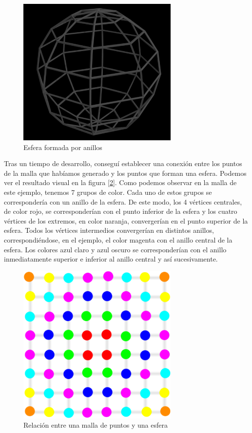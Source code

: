 \begin{figure}[h]
	\centering
	\includegraphics[width=8cm]{archivos/sphere}
	\caption{Esfera formada por anillos}
	\label{fig:sphere}
\end{figure}

Tras un tiempo de desarrollo, conseguí establecer una conexión entre los puntos de la malla que habíamos generado y los puntos que forman una esfera. Podemos ver el resultado visual en la figura [\ref{fig:planeToSphere}]. Como podemos observar en la malla de este ejemplo, tenemos 7 grupos de color. Cada uno de estos grupos se correspondería con un anillo de la esfera. De este modo, los 4 vértices centrales, de color rojo, se corresponderían con el punto inferior de la esfera y los cuatro vértices de los extremos, en color naranja, convergerían en el punto superior de la esfera. Todos los vértices intermedios convergerían en distintos anillos, correspondiéndose, en el ejemplo, el color magenta con el anillo central de la esfera. Los colores azul claro y azul oscuro se corresponderían con el anillo inmediatamente superior e inferior al anillo central y así sucesivamente.\\

\begin{figure}[h]
	\centering
	\includegraphics[width=8cm]{archivos/planeToSphere}
	\caption{Relación entre una malla de puntos y una esfera}
	\label{fig:planeToSphere}
\end{figure}

